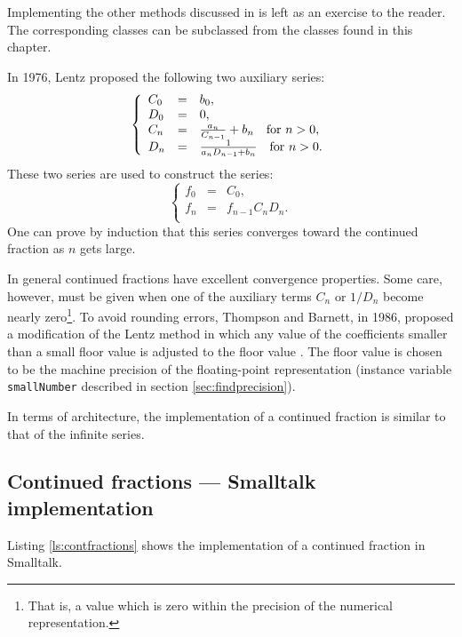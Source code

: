 \documentclass[twoside]{book}
\begin{document}
Implementing the other methods discussed in \cite{Press} is left
as an exercise to the reader. The corresponding classes can be
subclassed from the classes found in this chapter.

In 1976, Lentz proposed the following two auxiliary series:
\begin{equation}
  \left\{{
  \begin{array}{lcl}
    C_0 & = & b_0,\\
    D_0 & = & 0, \\
    C_n & = & {a_n \over C_{n-1}}+b_n\mbox{\quad for $n>0$}, \\
    D_n & = & {1 \over a_n D_{n-1}+b_n}\mbox{\quad for $n>0$}.
  \end{array}
  }\right.
\end{equation}
These two series are used to construct the series:
\begin{equation}
  \left\{{
  \begin{array}{lcl}
    f_0 & = & C_0,\\
    f_n & = & f_{n-1}C_n D_n. \\
  \end{array}
  }\right.
\end{equation}
One can prove by induction that this series converges toward the
continued fraction as $n$ gets large.

In general continued fractions have excellent convergence
properties. Some care, however, must be given when one of the
auxiliary terms $C_n$ or $1/D_n$ become nearly zero\footnote{That
is, a value which is zero within the precision of the numerical
representation.}. To avoid rounding errors, Thompson and Barnett,
in 1986, proposed a modification of the Lentz method in which any
value of the coefficients smaller than a small floor value is
adjusted to the floor value \cite{Press}. The floor value is
chosen to be the machine precision of the floating-point
representation (instance variable {\tt smallNumber} described in
section \ref{sec:findprecision}).

In terms of architecture, the implementation of a continued
fraction is similar to that of the infinite series.

\subsection{Continued fractions --- Smalltalk  implementation}
 Listing \ref{ls:contfractions} shows
the implementation of a continued fraction in Smalltalk.
\end{document}
